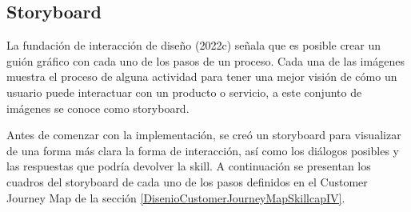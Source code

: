 \subsection{Storyboard}
\label{StoryboardcapIV}

La fundación de interacción de diseño (2022c) señala que es posible crear un guión gráfico con cada uno de los pasos de un proceso. Cada una de las imágenes muestra el proceso de alguna actividad para tener una mejor visión de cómo un usuario puede interactuar con un producto o servicio, a este conjunto de imágenes se conoce como storyboard.

Antes de comenzar con la implementación, se creó un storyboard para visualizar de una forma más clara la forma de interacción, así como los diálogos posibles y las respuestas que podría devolver la skill. A continuación se presentan los cuadros del storyboard de cada uno de los pasos definidos en el Customer Journey Map de la sección \ref{DisenioCustomerJourneyMapSkillcapIV}.

